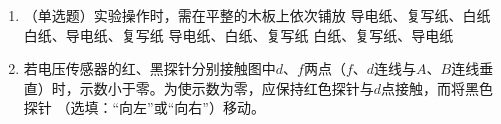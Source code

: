 \begin{enumerate}[leftmargin=0em]
\begin{enumerate}
\item 
（单选题）实验操作时，需在平整的木板上依次铺放  
\fourchoices
{导电纸、复写纸、白纸}
{白纸、导电纸、复写纸}
{导电纸、白纸、复写纸}
{白纸、复写纸、导电纸}


\item 
若电压传感器的红、黑探针分别接触图中$ d $、$ f $两点（$ f $、$ d $连线与$ A $、$ B $连线垂直）时，示数小于零。为使示数为零，应保持红色探针与$ d $点接触，而将黑色探针  （选填：“向左”或“向右”）移动。




\end{enumerate}








\end{enumerate}

